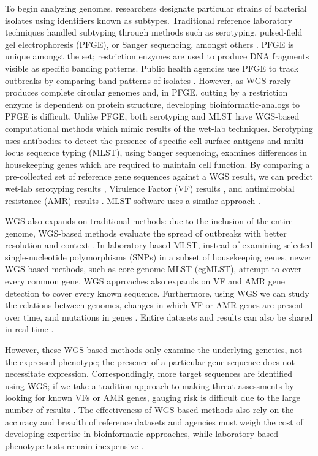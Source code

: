 \documentclass[a4,center,fleqn]{NAR}
\begin{document}
To begin analyzing genomes, researchers designate particular strains of bacterial isolates using identifiers known as subtypes.
Traditional reference laboratory techniques handled subtyping through methods such as serotyping, pulsed-field gel electrophoresis (PFGE), or Sanger sequencing, amongst others \cite{ronholm2016navigating}.
PFGE is unique amongst the set; restriction enzymes are used to produce DNA fragments visible as specific banding patterns.
Public health agencies use PFGE to track outbreaks by comparing band patterns of isolates \cite{kozak2013foodborne}.
However, as WGS rarely produces complete circular genomes and, in PFGE, cutting by a restriction enzyme is dependent on protein structure, developing bioinformatic-analogs to PFGE is difficult.
Unlike PFGE, both serotyping and MLST have WGS-based computational methods which mimic results of the wet-lab techniques.
Serotyping uses antibodies to detect the presence of specific cell surface antigens and multi-locus sequence typing (MLST), using Sanger sequencing, examines differences in housekeeping genes which are required to maintain cell function.
By comparing a pre-collected set of reference gene sequences against a WGS result, we can predict wet-lab serotyping results \cite{whiteside2016superphy}, Virulence Factor (VF) results \cite{joensen2014real}, and antimicrobial resistance (AMR) results \cite{mcarthur2013comprehensive}.
MLST software uses a similar approach \cite{larsen2012multilocus}.

WGS also expands on traditional methods: due to the inclusion of the entire genome, WGS-based methods evaluate the spread of outbreaks with better resolution and context \cite{ronholm2016navigating}.
In laboratory-based MLST, instead of examining selected single-nucleotide polymorphisms (SNPs) in a subset of housekeeping genes, newer WGS-based methods, such as core genome MLST (cgMLST), attempt to cover every common gene.
WGS approaches also expands on VF and AMR gene detection to cover every known sequence.
Furthermore, using WGS we can study the relations between genomes, changes in which VF or AMR genes are present over time, and mutations in genes \cite{ronholm2016navigating}.
Entire datasets and results can also be shared in real-time \cite{ronholm2016navigating}.

However, these WGS-based methods only examine the underlying genetics, not the expressed phenotype; the presence of a particular gene sequence does not necessitate expression.
Correspondingly, more target sequences are identified using WGS; if we take a tradition approach to making threat assessments by looking for known VFs or AMR genes, gauging risk is difficult due to the large number of results \cite{ronholm2016navigating}.
The effectiveness of WGS-based methods also rely on the accuracy and breadth of reference datasets and agencies must weigh the cost of developing expertise in bioinformatic approaches, while laboratory based phenotype tests remain inexpensive \cite{koser2012routine}.
\end{document}
